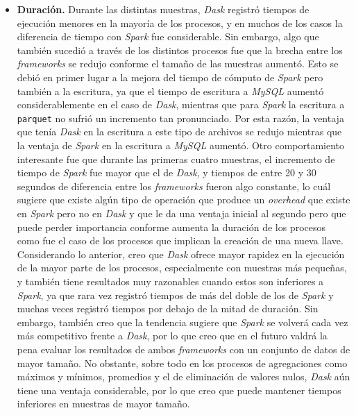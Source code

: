 \begin{itemize}
	\item \textbf{Duración.} Durante las distintas muestras, \textit{Dask} registró tiempos de ejecución menores en la mayoría de los procesos, y en muchos de los casos la diferencia de tiempo con \textit{Spark} fue considerable. Sin embargo, algo que también sucedió a través de los distintos procesos fue que la brecha entre los \textit{frameworks} se redujo conforme el tamaño de las muestras aumentó. Esto se debió en primer lugar a la mejora del tiempo de cómputo de \textit{Spark} pero también a la escritura, ya que el tiempo de escritura a \textit{MySQL} aumentó considerablemente en el caso de \textit{Dask}, mientras que para \textit{Spark} la escritura a \texttt{parquet} no sufrió un incremento tan pronunciado. Por esta razón, la ventaja que tenía \textit{Dask} en la escritura a este tipo de archivos se redujo mientras que la ventaja de \textit{Spark} en la escritura a \textit{MySQL} aumentó. Otro comportamiento interesante fue que durante las primeras cuatro muestras, el incremento de tiempo de \textit{Spark} fue mayor que el de \textit{Dask}, y tiempos de entre 20 y 30 segundos de diferencia entre los \textit{frameworks} fueron algo constante, lo cuál sugiere que existe algún tipo de operación que produce un \textit{overhead} que existe en \textit{Spark} pero no en \textit{Dask} y que le da una ventaja inicial al segundo pero que puede perder importancia conforme aumenta la duración de los procesos como fue el caso de los procesos que implican la creación de una nueva llave. Considerando lo anterior, creo que \textit{Dask} ofrece mayor rapidez en la ejecución de la mayor parte de los procesos, especialmente con muestras más pequeñas, y también tiene resultados muy razonables cuando estos son inferiores a \textit{Spark}, ya que rara vez registró tiempos de más del doble de los de \textit{Spark} y muchas veces registró tiempos por debajo de la mitad de duración. Sin embargo, también creo que la tendencia sugiere que \textit{Spark} se volverá cada vez más competitivo frente a \textit{Dask}, por lo que creo que en el futuro valdrá la pena evaluar los resultados de ambos \textit{frameworks} con un conjunto de datos de mayor tamaño. No obstante, sobre todo en los procesos de agregaciones como máximos y mínimos, promedios y el de eliminación de valores nulos, \textit{Dask} aún tiene una ventaja considerable, por lo que creo que puede mantener tiempos inferiores en muestras de mayor tamaño.
	
\end{itemize}